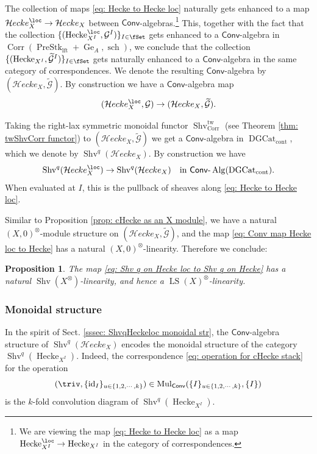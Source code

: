 \documentclass[10pt]{amsart}
\newcommand{\sssec}{\subsubsection}
\newtheorem{prop}[subsubsection]{Proposition}
\theoremstyle{remark}
\newcommand{\te}{\text}
\newcommand{\wt}{\widetilde}
\newcommand{\on}{\operatorname}
\newcommand{\cG}{\mathcal{G}}
\newcommand{\DGcat}{\on{DGCat}_{\on{cont}}}
\newcommand{\lAlg}{\text{-}\on{Alg}}
\newcommand{\Shv}{\on{Shv}}
\newcommand{\LS}{\on{LS}}
\newcommand{\PreStklft}{\on{PreStk}_{\on{lft}}}
\newcommand{\id}{\on{id}}
\newcommand{\Hecke}{\on{Hecke}}
\newcommand{\Mul}{\on{Mul}}
\newcommand{\Conv}{\mathsf{Conv}}
\newcommand{\cHecke}{\mathcal{H}ecke}
\newcommand{\Corr}{\on{Corr}}
\begin{document}
\sssec{}\label{sssec: Shv q cHecke}
The collection of maps \eqref{eq: Hecke to Hecke loc} naturally gets enhanced to a map $\cHecke^{\loc}_X\rightarrow\cHecke_{X}$ between $\Conv$-algebras.\footnote{We are viewing the map \eqref{eq: Hecke to Hecke loc} as a map $\Hecke^{\loc}_{X^I}\rightarrow \Hecke_{X^I}$ in the category of correspondences.} This, together with the fact that the collection $\{(\Hecke^{\loc}_{X^I},\cG^I)\}_{I\in\fSet}$ gets enhanced to a $\Conv$-algebra in $\Corr(\PreStklft+\on{Ge}_A,\on{sch})$, we conclude that the collection
$\{(\Hecke_{X^I},\wt{\cG}^I)\}_{I\in\fSet}$ gets naturally enhanced to a $\Conv$-algebra in the same category of correspondences. We denote the resulting $\Conv$-algebra by $(\cHecke_X, \wt{\cG})$. By construction we have a $\Conv$-algebra map
\begin{equation}\label{eq: Conv map Hecke loc to Hecke}
    (\cHecke^{\loc}_X,\cG)\rightarrow (\cHecke_X,\wt{\cG}).
\end{equation}

Taking the right-lax symmetric monoidal functor $\Shv^{\on{tw}}_{\Corr}$ (see Theorem \ref{thm: twShvCorr functor}) to $(\cHecke_X, \wt{\cG})$ we get a $\Conv$-algebra in $\DGcat$, which we denote by $\Shv^q(\cHecke_X)$. By construction we have
\begin{equation}\label{eq: Shv q on Hecke loc to Shv q on Hecke}
    \Shv^q(\cHecke^{\loc}_X)\rightarrow \Shv^q(\cHecke_X)\quad \te{in }\Conv\lAlg(\DGcat).
\end{equation}
When evaluated at $I$, this is the pullback of sheaves along \eqref{eq: Hecke to Hecke loc}.
\medskip

Similar to Proposition \ref{prop: cHecke as an X module}, we have a natural $(X,0)^{\otimes}$-module structure on $(\cHecke_X,\wt{\cG})$, and the map \eqref{eq: Conv map Hecke loc to Hecke} has a natural $(X,0)^{\otimes}$-linearity. Therefore we conclude:
\begin{prop}
    The map \eqref{eq: Shv q on Hecke loc to Shv q on Hecke} has a natural $\Shv(X^{\otimes})$-linearity, and hence a $\LS(X)^{\otimes}$-linearity.
\end{prop}

\sssec{Monoidal structure}\label{sssec: monoidal structure ShvqHecke}
In the spirit of Sect. \ref{sssec: ShvqHeckeloc monoidal str}, the $\Conv$-algebra structure of $\Shv^q(\cHecke_{X})$ encodes the monoidal structure of the category $\Shv^q(\Hecke_{X^I})$. Indeed, the correspondence \eqref{eq: operation for cHecke stack} for the operation \[(\triv, \{\id_I\}_{u\in \{1,2,\cdots,k\}})\in \Mul_{\Conv}(\{I\}_{u\in \{1,2,\cdots,k\}},\{I\})\]
    is the $k$-fold convolution diagram of $\Shv^q(\Hecke_{X^I})$.
    \medskip
\end{document}
